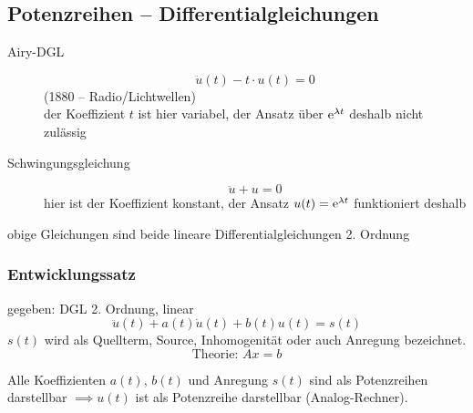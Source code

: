 
\subsection{Potenzreihen -- Differentialgleichungen}

\begin{description}
\item[Airy-DGL]
\begin{equation*}
	\ddot{u}(t) - t \cdot u(t) = 0
\end{equation*}
(1880 -- Radio/Lichtwellen)\\der Koeffizient $t$ ist hier variabel, der Ansatz über $\operatorname{e}^{\lambda t}$ deshalb nicht zulässig

\item[Schwingungsgleichung]
\begin{equation*}
	\ddot{u} + u = 0
\end{equation*}
hier ist der Koeffizient konstant, der Ansatz $u(t) = \operatorname{e}^{\lambda t}$ funktioniert deshalb

\end{description}
obige Gleichungen sind beide lineare Differentialgleichungen 2. Ordnung

\subsubsection*{Entwicklungssatz}
gegeben: DGL 2. Ordnung, linear
\begin{equation*}
	\ddot{u}(t) + a(t)\dot{u}(t) + b(t)u(t) = s(t)
\end{equation*}
%
$s(t)$ wird als Quellterm, Source, Inhomogenität oder auch Anregung bezeichnet.
\begin{equation*}
	\text{Theorie: }Ax = b
\end{equation*}

\begin{theorem}[Entwicklungssatz]
	Alle Koeffizienten $a(t)$, $b(t)$ und Anregung $s(t)$ sind als Potenzreihen darstellbar $\implies u(t)$ ist als Potenzreihe darstellbar (Analog-Rechner).
\end{theorem}

